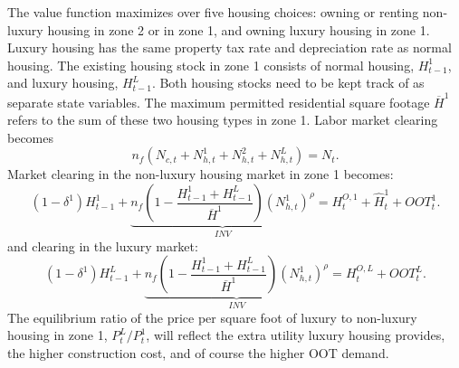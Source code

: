\documentclass[letterpaper,12pt,dvipsnames,usenames]{article}
\theoremstyle{definition}
\begin{document}
\begin{spacing}{1.25}
{The value function maximizes over five housing choices: owning or renting non-luxury housing in zone 2 or in zone 1, and owning luxury housing in zone 1. Luxury housing has the same property tax rate and depreciation rate as normal housing. The existing housing stock in zone 1 consists of normal housing, $H_{t-1}^{1}$, and luxury housing, $H_{t-1}^{L}$. Both housing stocks need to be kept track of as separate state variables. The maximum permitted residential square footage $\overline{H}^1$ refers to the sum of these two housing types in zone 1.
Labor market clearing becomes
\begin{equation*}
n_{f}\left(N_{c,t}+N^{1}_{h,t}+N^{2}_{h,t}+N^{L}_{h,t}\right)=N_{t}.
\end{equation*}
Market clearing in the non-luxury housing market in zone 1 becomes:
\begin{equation}\label{Eq:MarketClearingHousingN}
(1-\delta^{1})H^1_{t-1}+\underbrace{n_{f}\left(1-\frac{H^{1}_{t-1}+H_{t-1}^{L}}{\overline{H}^1}\right)\left(N^1_{h,t}\right)^{\rho}}_{INV}=H^{O,1}_{t}+\widehat{H}^1_{t}+OOT^1_{t}.
\end{equation}
and clearing in the luxury market:
\begin{equation}\label{Eq:MarketClearingHousingL}
(1-\delta^{1})H^L_{t-1}+\underbrace{n_{f}\left(1-\frac{H^{1}_{t-1}+H_{t-1}^{L}}{\overline{H}^1}\right)\left(N^1_{h,t}\right)^{\rho}}_{INV}=H^{O,L}_{t}+OOT^L_{t}.
\end{equation}
The equilibrium ratio of the price per square foot of luxury to non-luxury housing in zone 1, $P_t^L/P_t^1$, will reflect the extra utility luxury housing provides, the higher construction cost, and of course the higher OOT demand.


}
\end{spacing}
\end{document}
